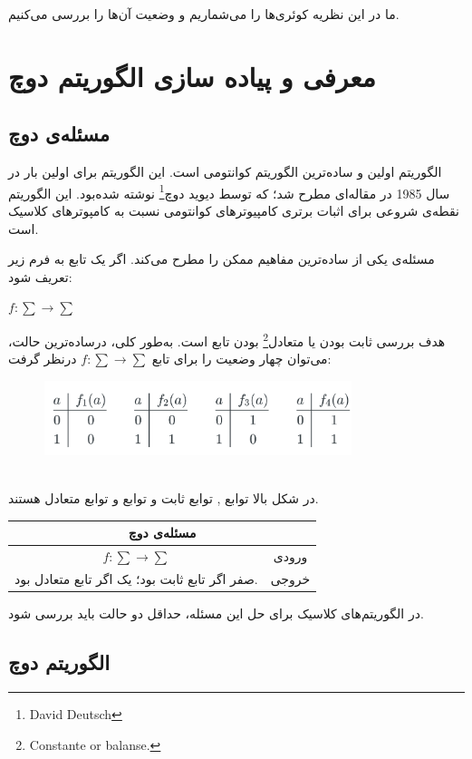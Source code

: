 \documentclass{book}
\begin{document}
ما در این نظریه کوئری‌ها را می‌شماریم و وضعیت آن‌‌ها را بررسی می‌کنیم.

\section{معرفی و پیاده سازی الگوریتم دوچ}

\subsection{مسئله‌ی دوچ}
الگوریتم  اولین و ساده‌ترین الگوریتم کوانتومی‌ است. این الگوریتم برای اولین بار در سال 1985 در مقاله‌ای مطرح شد؛ که توسط دیوید دوچ\footnote{David Deutsch} نوشته شده‌‌بود. این الگوریتم نقطه‌ی شروعی برای اثبات برتری کامپیوترهای کوانتومی نسبت به کامپوترهای کلاسیک است.

مسئله‌ی  یکی از ساده‌ترین مفاهیم ممکن را مطرح می‌کند. اگر یک تابع به فرم زیر تعریف شود: 
\begin{center}
	$f : \sum \rightarrow \sum$
\end{center}
هدف بررسی ثابت بودن یا متعادل\footnote{Constante or balanse.} بودن تابع  است. 
به‌طور کلی، درساده‌ترین حالت، می‌توان چهار وضعیت را برای تابع $f : \sum \rightarrow \sum$ درنظر گرفت:\\
\begin{figure}[ht]
	\centering
	\includegraphics[width=0.8\textwidth]{Constantorbalanse.png}
	\caption{}
\end{figure}\\
در شکل بالا توابع  ,  توابع ثابت و توابع  و  توابع متعادل هستند.
\begin{center}
\begin{tabular}{|c|c|}
	\hline
	\multicolumn{2}{|c|}{مسئله‌ی دوچ} \\
	\hline
	$f : \sum \rightarrow \sum$ & ورودی \\
	\hline
	صفر اگر تابع ثابت بود؛ یک اگر تابع متعادل بود.  & خروجی \\
	\hline
\end{tabular}
\end{center}
در الگوریتم‌های کلاسیک برای حل این مسئله، حداقل دو حالت باید بررسی شود.
\subsection{الگوریتم دوچ}
\end{document}
